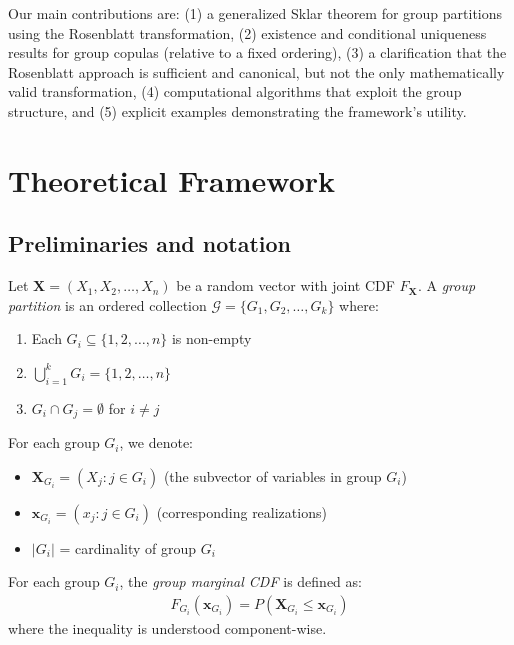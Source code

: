 Our main contributions are: (1) a generalized Sklar theorem for group partitions using the Rosenblatt transformation, (2) existence and conditional uniqueness results for group copulas (relative to a fixed ordering), (3) a clarification that the Rosenblatt approach is sufficient and canonical, but not the only mathematically valid transformation, (4) computational algorithms that exploit the group structure, and (5) explicit examples demonstrating the framework's utility.

\section{Theoretical Framework}
\subsection{Preliminaries and notation}
\begin{definition}
Let $\mathbf{X} = (X_1, X_2, \ldots, X_n)$ be a random vector with joint CDF $F_{\mathbf{X}}$. A \emph{group partition} is an ordered collection $\mathcal{G} = \{G_1, G_2, \ldots, G_k\}$ where:
\begin{enumerate}
    \item Each $G_i \subseteq \{1, 2, \ldots, n\}$ is non-empty
    \item $\bigcup_{i=1}^k G_i = \{1, 2, \ldots, n\}$
    \item $G_i \cap G_j = \emptyset$ for $i \neq j$
\end{enumerate}
For each group $G_i$, we denote:
\begin{itemize}
    \item $\mathbf{X}_{G_i} = (X_j : j \in G_i)$ (the subvector of variables in group $G_i$)
    \item $\mathbf{x}_{G_i} = (x_j : j \in G_i)$ (corresponding realizations)
    \item $|G_i|$ = cardinality of group $G_i$
\end{itemize}
\end{definition}

\begin{definition}
For each group $G_i$, the \emph{group marginal CDF} is defined as:
\begin{align}
F_{G_i}(\mathbf{x}_{G_i}) = P(\mathbf{X}_{G_i} \leq \mathbf{x}_{G_i})
\end{align}
where the inequality is understood component-wise.
\end{definition}

